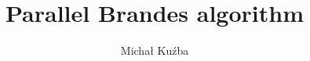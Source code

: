 \documentclass[]{article}
\title{Parallel Brandes algorithm}
\author{Michał Kuźba}
\begin{document}
\maketitle

\section{}

\parencite{brandes:01}

\parencite[p. 539-550]{bader:06}
\section{}

\section{}

\section{}


\nocite{*}
\printbibliography
\end{document}
